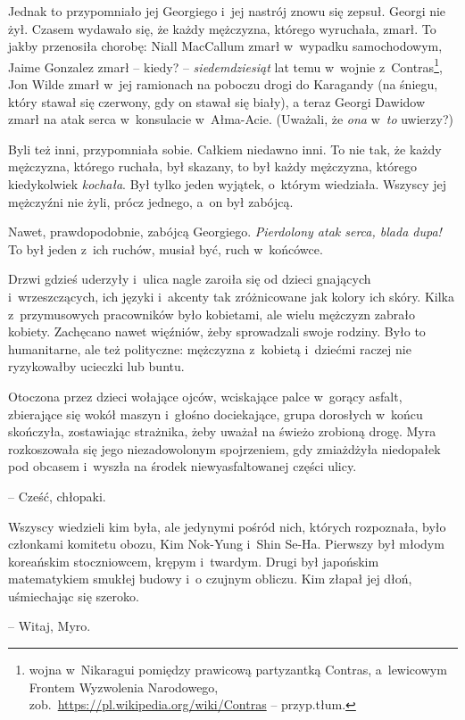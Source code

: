 \documentclass[oneside,polish,11pt,sfheadings]{mwbk}
\begin{document}
Jednak to przypomniało jej Georgiego i~jej nastrój znowu się zepsuł.
Georgi nie żył. Czasem wydawało się, że każdy mężczyzna, którego
wyruchała, zmarł. To jakby przenosiła chorobę: Niall MacCallum zmarł w~wypadku samochodowym, Jaime Gonzalez zmarł -- kiedy? -- \textit{siedemdziesiąt} lat temu w~wojnie z~Contras\footnote{ wojna w~Nikaragui
pomiędzy prawicową partyzantką Contras, a~lewicowym Frontem Wyzwolenia
Narodowego, zob.~\url{https://pl.wikipedia.org/wiki/Contras} -- przyp.tłum.}, Jon Wilde zmarł w~jej ramionach na poboczu drogi do
Karagandy (na śniegu, który stawał się czerwony, gdy on stawał się biały),
a teraz Georgi Dawidow zmarł na atak serca w~konsulacie w~Ałma-Acie.
(Uważali, że \textit{ona} w~\textit{to} uwierzy?)

Byli też inni, przypomniała sobie. Całkiem niedawno inni. To nie tak, że
każdy mężczyzna, którego ruchała, był skazany, to był każdy mężczyzna,
którego kiedykolwiek \textit{kochała}. Był tylko jeden wyjątek, o~którym
wiedziała. Wszyscy jej mężczyźni nie żyli, prócz jednego, a~on był
zabójcą.

Nawet, prawdopodobnie, zabójcą Georgiego. \textit{Pierdolony atak serca,
blada dupa!} To był jeden z~ich ruchów, musiał być, ruch w~końcówce.

Drzwi gdzieś uderzyły i~ulica nagle zaroiła się od dzieci gnających i~wrzeszczących, ich języki i~akcenty tak zróżnicowane jak kolory ich
skóry. Kilka z~przymusowych pracowników było kobietami, ale wielu
mężczyzn zabrało kobiety. Zachęcano nawet więźniów, żeby sprowadzali
swoje rodziny. Było to humanitarne, ale też polityczne: mężczyzna z~kobietą i~dziećmi raczej nie ryzykowałby ucieczki lub buntu.

Otoczona przez dzieci wołające ojców, wciskające palce w~gorący
asfalt, zbierające się wokół maszyn i~głośno dociekające, grupa dorosłych w~końcu
skończyła, zostawiając strażnika, żeby uważał na świeżo zrobioną drogę.
Myra rozkoszowała się jego niezadowolonym spojrzeniem, gdy zmiażdżyła
niedopałek pod obcasem i~wyszła na środek niewyasfaltowanej części
ulicy.

-- Cześć, chłopaki.

Wszyscy wiedzieli kim była, ale jedynymi pośród nich, których
rozpoznała, było członkami komitetu obozu, Kim Nok-Yung i~Shin Se-Ha.
Pierwszy był młodym koreańskim stoczniowcem, krępym i~twardym. Drugi był
japońskim matematykiem smukłej budowy i~o czujnym obliczu. Kim złapał
jej dłoń, uśmiechając się szeroko.

-- Witaj, Myro.
\end{document}
